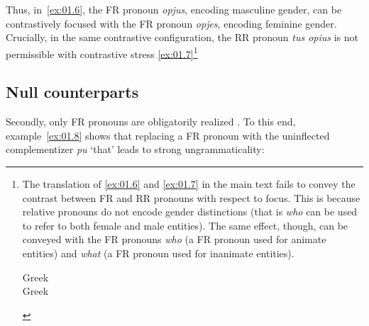 \documentclass[output=paper]{langsci/langscibook}
\begin{document}
Thus, in~\eqref{ex:01.6}, the \gls{FR} pronoun \emph{opjus}, encoding masculine gender,
can be contrastively focused with the \gls{FR} pronoun \emph{opjes}, encoding
feminine gender. Crucially, in the same contrastive configuration, the
\gls{RR} pronoun \emph{tus opius} is not permissible with contrastive stress
\eqref{ex:01.7}\footnote{The  translation of \eqref{ex:01.6} and
    \eqref{ex:01.7} in the main text fails to convey the
    contrast between \gls{FR} and \gls{RR} pronouns with respect to focus. This
    is because  relative pronouns do not encode gender
    distinctions (that is \emph{who} can be used to refer to both female and
    male entities). The same effect, though, can be conveyed with the
     \gls{FR} pronouns \emph{who} (a \gls{FR} pronoun used for
    animate entities) and \emph{what} (a \gls{FR} pronoun used for inanimate
    entities).

\begin{exe}
     Greek\\
     Greek\\
\end{exe}}

\subsection{Null counterparts}
Secondly, only \gls{FR} pronouns are
obligatorily realized \parencite[22]{AleLawMeiWil2000}. To this end,
example~\eqref{ex:01.8} shows that replacing a \gls{FR} pronoun with the
uninflected complementizer \emph{pu} ‘that’ leads to strong ungrammaticality:
\end{document}
